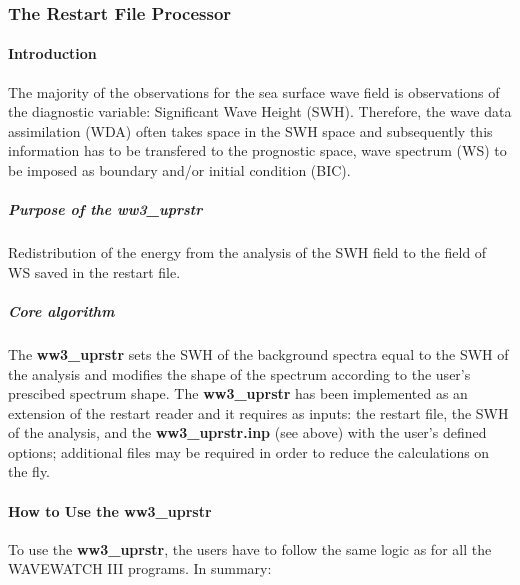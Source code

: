 \vsssub
\subsubsection{The Restart File Processor} \label{sec:ww3uprstr}
\vsssub



\vspace{\baselineskip} 

\paragraph{Introduction \newline } 

The majority of the observations for the sea surface wave field is 
observations of the diagnostic variable: Significant Wave Height (SWH). 
Therefore, the wave data assimilation (WDA) often takes space in the SWH 
space and subsequently this information has to be transfered to the 
prognostic space, wave spectrum (WS) to be imposed as boundary and/or 
initial condition (BIC). 

\subparagraph{Purpose of the \textbf{ww3\_uprstr}  \newline } Redistribution of 
the energy from the analysis of the SWH field to the field of WS saved
in the restart file. 

\subparagraph{Core algorithm \newline } 
The \textbf{ww3\_uprstr} sets the SWH of the background spectra equal to 
the SWH of the analysis and modifies the shape of the spectrum according 
to the user's prescibed spectrum shape. The \textbf{ww3\_uprstr} has been  
implemented as an extension of the restart reader and it requires as inputs: 
the restart file, the SWH of the analysis, and the \textbf{ww3\_uprstr.inp} 
(see above) with the user's defined options; additional files may be
required in order to reduce the calculations on the fly.

\paragraph{How to Use the ww3\_uprstr \newline}
To use the \textbf{ww3\_uprstr}, the users have to follow the same logic 
as for all the WAVEWATCH III programs. In summary: 

